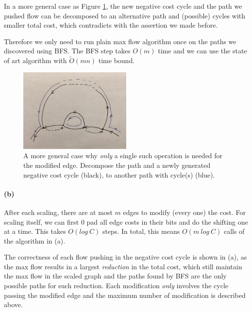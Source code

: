 \documentclass[12pt]{article}
\begin{document}
In a more general case as Figure \ref{fig:1-2}, the new negative cost cycle and the path we pushed flow can be decomposed to an alternative path and (possible) cycles with smaller total cost, which contradicts with the assertion we made before. 

Therefore we only need to run plain max flow algorithm once on the paths we discovered using BFS. The BFS step takes $O(m)$ time and we can use the state of art algorithm with $\tilde{O}(mn)$ time bound.

\begin{figure}[h!]
\centering
\includegraphics[width=0.5\textwidth]{1-2.jpg}
\caption{A more general case why \emph{only} a single such operation is needed for the modified edge. Decompose the path and a newly generated negative cost cycle (black), to another path with cycle(s) (blue).}
\label{fig:1-2}
\end{figure}
\paragraph{(b)} After each scaling, there are at most $m$ edges to modify (every one) the cost. For scaling itself, we can first 0 pad all edge costs in their bits and do the shifting one at a time. This takes $O(log~C)$ steps. In total, this means $O(m~log~C)$ calls of the algorithm in (a). 

The correctness of each flow pushing in the negative cost cycle is shown in (a), as the max flow results in a largest \emph{reduction} in the total cost, which still maintain the max flow in the scaled graph and the paths found by BFS are the only possible paths for such reduction. Each modification \emph{only} involves the cycle passing the modified edge and the maximum number of modification is described above. 

\newpage
\end{document}
